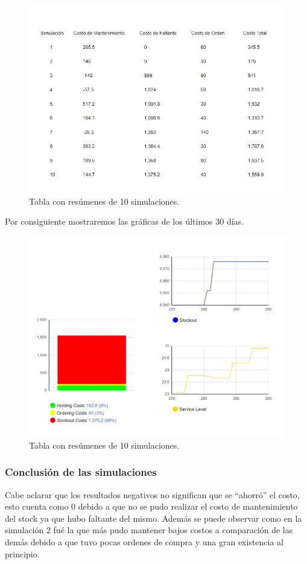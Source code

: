 \begin{figure}[H]
    \includegraphics[width=\linewidth]{images/tabla}
    \caption{Tabla con resúmenes de 10 simulaciones.}
\end{figure}

Por consiguiente mostraremos las gráficas de los últimos 30 días.

\begin{figure}[H]
    \includegraphics[width=\linewidth]{images/resumen final}
    \caption{Tabla con resúmenes de 10 simulaciones.}
\end{figure}

\subsubsection{Conclusión de las simulaciones}\label{subsubsec:conclusiones}
Cabe aclarar que los resultados negativos no significan que se ``ahorró'' el costo, esto cuenta como 0 debido a que no se pudo realizar el costo de mantenimiento del stock ya que hubo faltante del mismo.
Además se puede observar como en la simulación 2 fué la que más pudo mantener bajos costos a comparación de las demás debido a que tuvo pocas ordenes de compra y una gran existencia al principio.

